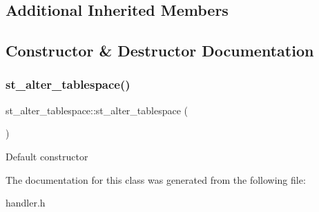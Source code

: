 \subsection*{Additional Inherited Members}


\subsection{Constructor \& Destructor Documentation}
\mbox{\label{classst__alter__tablespace_ad394f40c80785ff5fe0c33d91dc01c07}} 
\subsubsection{\texorpdfstring{st\+\_\+alter\+\_\+tablespace()}{st\_alter\_tablespace()}}
{\footnotesize\ttfamily st\+\_\+alter\+\_\+tablespace\+::st\+\_\+alter\+\_\+tablespace (\begin{DoxyParamCaption}{ }\end{DoxyParamCaption})\hspace{0.3cm}{\ttfamily [inline]}}

Default constructor 

The documentation for this class was generated from the following file\+:\begin{DoxyCompactItemize}
\item 
handler.\+h\end{DoxyCompactItemize}
